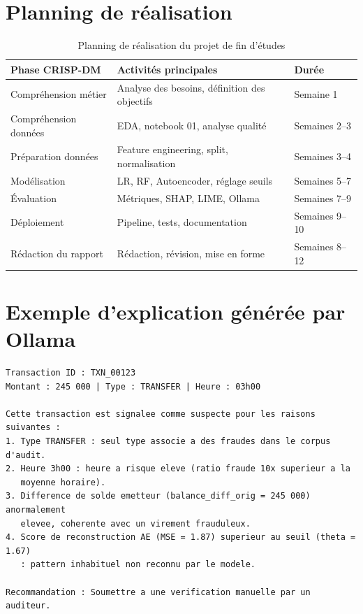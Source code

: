\documentclass[12pt,a4paper,twoside]{report}
\begin{document}
\chapter{Planning de réalisation}

\begin{table}[H]
\centering
\caption{Planning de réalisation du projet de fin d'études}
\label{tab:planning}
\begin{tabular}{lll}
\toprule
\textbf{Phase CRISP-DM} & \textbf{Activités principales} & \textbf{Durée} \\
\midrule
Compréhension métier    & Analyse des besoins, définition des objectifs & Semaine 1 \\
Compréhension données   & EDA, notebook 01, analyse qualité & Semaines 2--3 \\
Préparation données     & Feature engineering, split, normalisation & Semaines 3--4 \\
Modélisation            & LR, RF, Autoencoder, réglage seuils & Semaines 5--7 \\
Évaluation              & Métriques, SHAP, LIME, Ollama & Semaines 7--9 \\
Déploiement             & Pipeline, tests, documentation & Semaines 9--10 \\
Rédaction du rapport    & Rédaction, révision, mise en forme & Semaines 8--12 \\
\bottomrule
\end{tabular}
\end{table}

\chapter{Exemple d'explication générée par Ollama}

\begin{lstlisting}[caption={Exemple d'explication pour une transaction suspecte}]
Transaction ID : TXN_00123
Montant : 245 000 | Type : TRANSFER | Heure : 03h00

Cette transaction est signalee comme suspecte pour les raisons suivantes :
1. Type TRANSFER : seul type associe a des fraudes dans le corpus d'audit.
2. Heure 3h00 : heure a risque eleve (ratio fraude 10x superieur a la
   moyenne horaire).
3. Difference de solde emetteur (balance_diff_orig = 245 000) anormalement
   elevee, coherente avec un virement frauduleux.
4. Score de reconstruction AE (MSE = 1.87) superieur au seuil (theta = 1.67)
   : pattern inhabituel non reconnu par le modele.

Recommandation : Soumettre a une verification manuelle par un auditeur.
\end{lstlisting}
\end{document}

